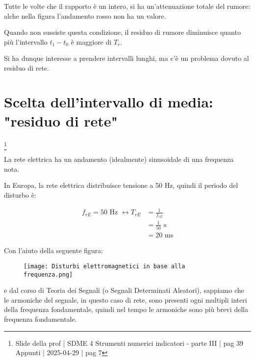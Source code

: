 Tutte le volte che il rapporto è un intero, si ha un'attenuazione totale del rumore: 
alche nella figura l'andamento rosso non ha un valore. \newline 

Quando non sussiste questa condizione, il residuo di rumore diminuisce quanto più l'intervallo $t_1 - t_0$ è maggiore di $T_r$. \newline 

Si ha dunque interesse a prendere intervalli lunghi, ma c'è un problema dovuto al residuo di rete. \newline 

\newpage 

\section{Scelta dell'intervallo di media: "residuo di rete"}
\footnote{Slide della prof | SDME 4 Strumenti numerici indicatori - parte III | pag 39 \\  
Appunti | 2025-04-29 | pag 7}

La rete elettrica ha un andamento (idealmente) sinusoidale di una frequenza nota. \newline 

In Europa, la rete elettrica distribuisce tensione a 50 Hz, quindi il periodo del disturbo è: 

{
    \Large 
    \begin{equation}
        \begin{split}
            f_{rE} = 50 \text{ Hz } 
            \leftrightarrow 
            T_{rE} 
            &=  \frac{1}{f_{rE}}
            \\
            &= \frac{1}{50} \text{ s }
            \\ 
            &= 20 \text{ ms}
        \end{split}
    \end{equation}
}

Con l'aiuto della seguente figura: 

\begin{figure}[h]
    \centering
    \texttt{[image: Disturbi elettromagnetici in base alla frequenza.png]}
\end{figure}

e dal corso di Teoria dei Segnali (o Segnali Determinati Aleatori), 
sappiamo che le armoniche del segnale, in questo caso di rete, sono presenti ogni multipli interi della frequenza fondamentale, 
quindi nel tempo le armoniche sono più brevi della frequenza fondamentale. \newline 

